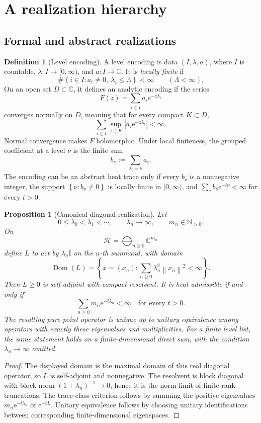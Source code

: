 \documentclass[11pt,a4paper]{article}
\newtheorem{proposition}[theorem]{Proposition}
\theoremstyle{definition}
\newtheorem{definition}[theorem]{Definition}
\theoremstyle{remark}
\newcommand{\C}{\mathbb C}
\newcommand{\N}{\mathbb N}
\newcommand{\Hcal}{\mathcal H}
\newcommand{\Dom}{\operatorname{Dom}}
\newcommand{\Id}{\mathrm I}
\newcommand{\e}{\mathrm e}
\newcommand{\norm}[1]{\left\lVert #1\right\rVert}
\newcommand{\abs}[1]{\left\lvert #1\right\rvert}
\newcommand{\set}[1]{\left\{#1\right\}}
\begin{document}
\section{A realization hierarchy}

\subsection{Formal and abstract realizations}

\begin{definition}[Level encoding]
A level encoding is data \((I,\lambda,a)\), where \(I\) is countable,
\(\lambda:I\to[0,\infty)\), and \(a:I\to\C\). It is \emph{locally finite} if
\[
 \#\set{i\in I:a_i\neq0,\ \lambda_i\leq\Lambda}<\infty
 \qquad(\Lambda<\infty).
\]
On an open set \(D\subset\C\), it defines an analytic encoding if the series
\[
 F(z)=\sum_{i\in I}a_i\e^{-z\lambda_i}
\]
converges normally on \(D\), meaning that for every compact \(K\subset D\),
\[
 \sum_{i\in I}\sup_{z\in K}
 \abs{a_i\e^{-z\lambda_i}}<\infty.
\]
Normal convergence makes \(F\) holomorphic. Under local finiteness, the grouped
coefficient at a level \(\nu\) is the finite sum
\[
 b_\nu:=\sum_{\lambda_i=\nu}a_i.
\]
The encoding can be an abstract heat trace only if every \(b_\nu\) is a
nonnegative integer, the support \(\set{\nu:b_\nu\neq0}\) is locally finite in
\([0,\infty)\), and
\(\sum_\nu b_\nu\e^{-t\nu}<\infty\) for every \(t>0\).
\end{definition}

\begin{proposition}[Canonical diagonal realization]
\label{prop:diagonal}
Let
\[
 0\leq\lambda_0<\lambda_1<\cdots,\qquad
 \lambda_n\to\infty,\qquad m_n\in\N_{>0}.
\]
On
\[
 \Hcal=\bigoplus_{n\geq0}\C^{m_n}
\]
define \(L\) to act by \(\lambda_n\Id\) on the \(n\)-th summand, with domain
\[
 \Dom(L)=
 \set{x=(x_n):\sum_{n\geq0}\lambda_n^2\norm{x_n}^2<\infty}.
\]
Then \(L\geq0\) is self-adjoint with compact resolvent.
It is heat-admissible if and only if
\[
 \sum_{n\geq0}m_n\e^{-t\lambda_n}<\infty
 \quad\text{for every }t>0.
\]
The resulting pure-point operator is unique up to unitary equivalence among
operators with exactly these eigenvalues and multiplicities.
For a finite level list, the same statement holds on a finite-dimensional
direct sum, with the condition \(\lambda_n\to\infty\) omitted.
\end{proposition}

\begin{proof}
The displayed domain is the maximal domain of this real diagonal operator, so
\(L\) is self-adjoint and nonnegative.
The resolvent is block diagonal with block norm
\((1+\lambda_n)^{-1}\to0\), hence it is the norm limit of finite-rank
truncations. The trace-class criterion follows by summing the positive
eigenvalues \(m_n\e^{-t\lambda_n}\) of \(\e^{-tL}\). Unitary equivalence follows
by choosing unitary identifications between corresponding finite-dimensional
eigenspaces.
\end{proof}
\end{document}
